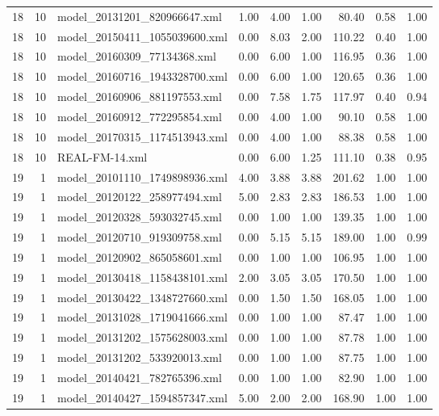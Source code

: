 \begin{table}[ht]
\begin{tabular}{rrlrrrrrr}
   18 &  10 & model\_20131201\_820966647.xml & 1.00 & 4.00 & 1.00 & 80.40 & 0.58 & 1.00 \\ 
   18 &  10 & model\_20150411\_1055039600.xml & 0.00 & 8.03 & 2.00 & 110.22 & 0.40 & 1.00 \\ 
   18 &  10 & model\_20160309\_77134368.xml & 0.00 & 6.00 & 1.00 & 116.95 & 0.36 & 1.00 \\ 
   18 &  10 & model\_20160716\_1943328700.xml & 0.00 & 6.00 & 1.00 & 120.65 & 0.36 & 1.00 \\ 
   18 &  10 & model\_20160906\_881197553.xml & 0.00 & 7.58 & 1.75 & 117.97 & 0.40 & 0.94 \\ 
   18 &  10 & model\_20160912\_772295854.xml & 0.00 & 4.00 & 1.00 & 90.10 & 0.58 & 1.00 \\ 
   18 &  10 & model\_20170315\_1174513943.xml & 0.00 & 4.00 & 1.00 & 88.38 & 0.58 & 1.00 \\ 
   18 &  10 & REAL-FM-14.xml & 0.00 & 6.00 & 1.25 & 111.10 & 0.38 & 0.95 \\ 
   19 &   1 & model\_20101110\_1749898936.xml & 4.00 & 3.88 & 3.88 & 201.62 & 1.00 & 1.00 \\ 
   19 &   1 & model\_20120122\_258977494.xml & 5.00 & 2.83 & 2.83 & 186.53 & 1.00 & 1.00 \\ 
   19 &   1 & model\_20120328\_593032745.xml & 0.00 & 1.00 & 1.00 & 139.35 & 1.00 & 1.00 \\ 
   19 &   1 & model\_20120710\_919309758.xml & 0.00 & 5.15 & 5.15 & 189.00 & 1.00 & 0.99 \\ 
   19 &   1 & model\_20120902\_865058601.xml & 0.00 & 1.00 & 1.00 & 106.95 & 1.00 & 1.00 \\ 
   19 &   1 & model\_20130418\_1158438101.xml & 2.00 & 3.05 & 3.05 & 170.50 & 1.00 & 1.00 \\ 
   19 &   1 & model\_20130422\_1348727660.xml & 0.00 & 1.50 & 1.50 & 168.05 & 1.00 & 1.00 \\ 
   19 &   1 & model\_20131028\_1719041666.xml & 0.00 & 1.00 & 1.00 & 87.47 & 1.00 & 1.00 \\ 
   19 &   1 & model\_20131202\_1575628003.xml & 0.00 & 1.00 & 1.00 & 87.78 & 1.00 & 1.00 \\ 
   19 &   1 & model\_20131202\_533920013.xml & 0.00 & 1.00 & 1.00 & 87.75 & 1.00 & 1.00 \\ 
   19 &   1 & model\_20140421\_782765396.xml & 0.00 & 1.00 & 1.00 & 82.90 & 1.00 & 1.00 \\ 
   19 &   1 & model\_20140427\_1594857347.xml & 5.00 & 2.00 & 2.00 & 168.90 & 1.00 & 1.00 \\ 

\end{tabular}
\end{table}
